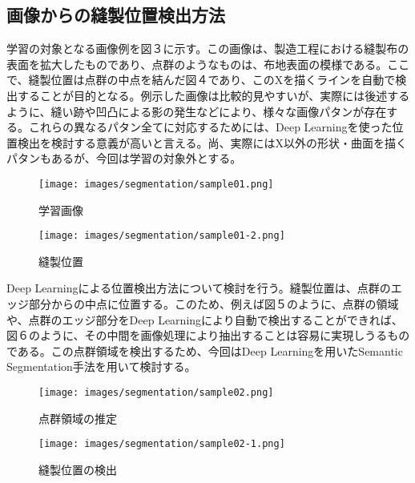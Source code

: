 \subsection{画像からの縫製位置検出方法}
学習の対象となる画像例を図３に示す。この画像は、製造工程における縫製布の表面を拡大したものであり、点群のようなものは、布地表面の模様である。ここで、縫製位置は点群の中点を結んだ図４であり、このXを描くラインを自動で検出することが目的となる。例示した画像は比較的見やすいが、実際には後述するように、縫い跡や凹凸による影の発生などにより、様々な画像パタンが存在する。これらの異なるパタン全てに対応するためには、Deep Learningを使った位置検出を検討する意義が高いと言える。尚、実際にはX以外の形状・曲面を描くパタンもあるが、今回は学習の対象外とする。

\begin{figure}[htbp]
 \begin{minipage}{0.5\hsize}
  \begin{center}
   \texttt{[image: images/segmentation/sample01.png]}
  \end{center}
  \caption{学習画像}
  \label{fig:one}
 \end{minipage}
 \begin{minipage}{0.5\hsize}
  \begin{center}
   \texttt{[image: images/segmentation/sample01-2.png]}
  \end{center}
  \caption{縫製位置}
  \label{fig:two}
 \end{minipage}
\end{figure}


Deep Learningによる位置検出方法について検討を行う。縫製位置は、点群のエッジ部分からの中点に位置する。このため、例えば図５のように、点群の領域や、点群のエッジ部分をDeep Learningにより自動で検出することができれば、図６のように、その中間を画像処理により抽出することは容易に実現しうるものである。この点群領域を検出するため、今回はDeep Learningを用いたSemantic Segmentation手法を用いて検討する。

\begin{figure}[htbp]
 \begin{minipage}{0.5\hsize}
  \begin{center}
   \texttt{[image: images/segmentation/sample02.png]}
  \end{center}
  \caption{点群領域の推定}
  \label{fig:three}
 \end{minipage}
 \begin{minipage}{0.5\hsize}
  \begin{center}
   \texttt{[image: images/segmentation/sample02-1.png]}
  \end{center}
  \caption{縫製位置の検出}
  \label{fig:four}
 \end{minipage}
\end{figure}


